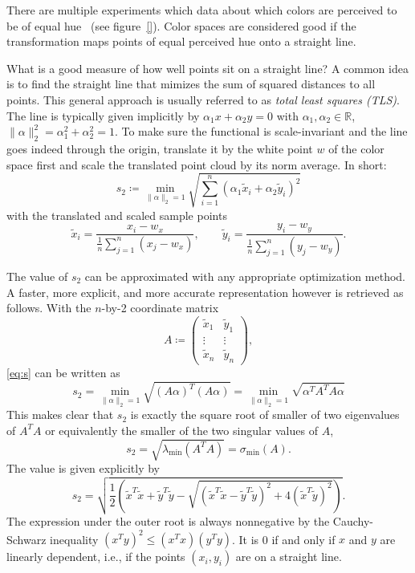 \documentclass{scrartcl}
\theoremstyle{named}
\newcommand\R{\ensuremath{\mathbb{R}}}
\begin{document}
There are multiple experiments which data about which colors are perceived to be of
equal hue~\cite{ebner,xiao,hung} (see figure~\ref{}). Color spaces are considered good
if the transformation maps points of equal perceived hue onto a straight line.

What is a good measure of how well points sit on a straight line?
A common idea is to find the straight line that mimizes the sum of squared distances to
all points. This general approach is usually referred to as \emph{total least squares
(TLS)}.
The line is typically given implicitly by $\alpha_1 x + \alpha_2 y
= 0$ with $\alpha_1,\alpha_2\in\R$, $\|\alpha\|_2^2 = \alpha_1^2 + \alpha_2^2 = 1$.
To make sure the functional is scale-invariant and the line goes indeed through the
origin, translate it by the white point $w$ of the color space first and scale the
translated point cloud by its norm average.
In short:
\begin{equation}\label{eq:s}
s_2 \coloneqq
\min_{\|\alpha\|_2=1}
  \sqrt{\sum_{i=1}^n (\alpha_1 \tilde{x}_i + \alpha_2 \tilde{y}_i)^2}
\end{equation}
with the translated and scaled sample points
\[
  \tilde{x}_i = \frac{x_i-w_x}{\frac{1}{n}\sum_{j=1}^n (x_j-w_x)},\qquad
  \tilde{y}_i = \frac{y_i-w_y}{\frac{1}{n}\sum_{j=1}^n (y_j-w_y)}.
\]

The value of $s_2$ can be approximated with any appropriate optimization method. A
faster, more explicit, and more accurate representation however is retrieved as follows.
With the $n$-by-2 coordinate matrix
\[
  A \coloneqq \begin{pmatrix}
    \tilde{x}_1 & \tilde{y}_1\\
    \vdots & \vdots\\
    \tilde{x}_n & \tilde{y}_n
  \end{pmatrix},
\]
\eqref{eq:s} can be written as
\[
  s_2
  = \min_{\|\alpha\|_2=1} \sqrt{(A \alpha)^T (A \alpha)}
  = \min_{\|\alpha\|_2=1} \sqrt{\alpha^T A^T A \alpha}
\]
This makes clear that $s_2$ is exactly the square root of smaller of two eigenvalues of
$A^TA$ or equivalently the smaller of the two singular values of $A$,
\[
s_2
= \sqrt{\lambda_{\min}(A^T A)}
= \sigma_{\min}(A).
\]
The value is given explicitly by
\begin{equation}\label{eq:s2}
  s_2 = \sqrt{
    \frac{1}{2} \left(
      \tilde{x}^T\tilde{x}
      + \tilde{y}^T\tilde{y}
      - \sqrt{(\tilde{x}^T\tilde{x} - \tilde{y}^T\tilde{y})^2 + 4 (\tilde{x}^T\tilde{y})^2}
      \right)
    }.
\end{equation}
The expression under the outer root is always nonnegative by the Cauchy-Schwarz
inequality $(x^Ty)^2 \le (x^Tx) (y^Ty)$. It is 0 if and only if $x$ and $y$ are linearly
dependent, i.e., if the points $(x_i, y_i)$ are on a straight line.
\end{document}
